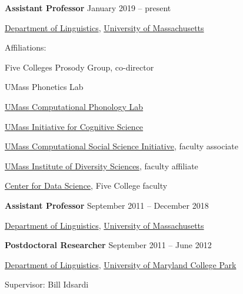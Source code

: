 \documentclass[10pt]{article}
\newcommand{\halfblankline}{\quad\vspace{-0.5\baselineskip}\pagebreak[3]}
\begin{document}
\textbf{Assistant Professor} \hfill {January 2019 -- present}
\begin{innerlist}

    \item[] \href{http://www.umass.edu/linguist}{Department of Linguistics},
            \href{http://www.umass.edu/linguist}{University of Massachusetts}
    \begin{innerlist}
        \item Affiliations:
            \begin{innerlist}[\enskip$\circ$,leftmargin=*]
                \item {Five Colleges Prosody Group}, co-director
                \item {UMass Phonetics Lab}
                \item \href{https://blogs.umass.edu/comphon/}{UMass Computational Phonology Lab}
                \item \href{https://blogs.umass.edu/cogsci/}{UMass
                    Initiative for Cognitive Science}
                \item\href{http://www.cssi.umass.edu/}{UMass
                    Computational Social Science Initiative}, faculty associate
                \item\href{https://www.umass.edu/diversitysciences/}{UMass Institute of Diversity Sciences}, faculty affiliate
                \item\href{https://ds.cs.umass.edu/}{Center for Data
                  Science}, Five College faculty
            \end{innerlist}
    \end{innerlist}

\end{innerlist}

\halfblankline

\textbf{Assistant Professor} \hfill {September 2011 -- December 2018}
\begin{innerlist}

    \item[] \href{http://www.umass.edu/linguist}{Department of Linguistics},
            \href{http://www.umass.edu/linguist}{University of Massachusetts}
    \end{innerlist}

\halfblankline

\textbf{Postdoctoral Researcher} \hfill {September 2011 -- June 2012}
\begin{innerlist}

    \item[] \href{http://ling.umd.edu/}{Department of Linguistics},
            \href{http://www.umd.edu}{University of Maryland College
              Park}
            \begin{innerlist}
        \item Supervisor: Bill Idsardi
        \end{innerlist}

\end{innerlist}
\end{document}
